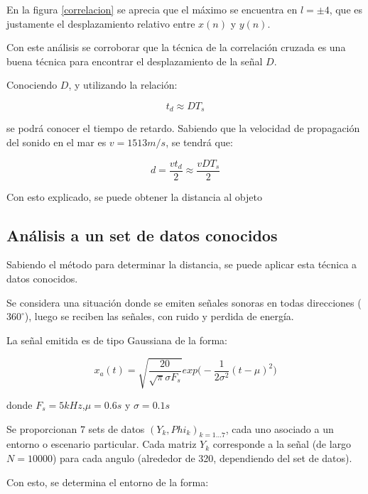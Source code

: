 \documentclass[letterpaper,11pt]{article}
\begin{document}
En la figura \ref{correlacion} se aprecia que el máximo se encuentra en $l = \pm 4$, que es justamente el desplazamiento relativo entre $x(n)$ y $y(n)$.

Con este análisis se corroborar que la técnica de la correlación cruzada es una buena técnica para encontrar el desplazamiento de la señal $D$.\par

Conociendo $D$, y utilizando la relación:

\begin{equation}
t_{d}\approx DT_{s}
\end{equation}

se podrá conocer el tiempo de retardo. Sabiendo que la velocidad de propagación del sonido en el mar es $ v = 1513 m/s$, se tendrá que:

\begin{equation}
d = \frac{vt_{d}}{2} \approx \frac{vDT_{s}}{2}
\end{equation}

Con esto explicado, se puede obtener la distancia al objeto

\subsection{Análisis a un set de datos conocidos}

Sabiendo el método para determinar la distancia, se puede aplicar esta técnica a datos conocidos. \par

Se considera una situación donde se emiten señales sonoras en todas direcciones ($360^{\circ}$), luego se reciben las señales, con ruido y perdida de energía.

La señal emitida es de tipo Gaussiana de la forma:

\begin{equation}
x_{a}(t) = \sqrt{\frac{20}{\sqrt{\pi}\sigma F_{s}}} exp\Bigg( -\frac{1}{2\sigma^2}(t-\mu)^2 \Bigg)
\end{equation}

donde $F_{s} = 5 kHz$,$\mu = 0.6s$ y $\sigma = 0.1s$

Se proporcionan 7 sets de datos $(Y_{k},Phi_{k})_{k=1...7}$, cada uno asociado a un entorno o escenario particular. Cada matriz $Y_{k}$ corresponde a la señal (de largo $N =10000$) para cada angulo (alrededor de 320, dependiendo del set de datos).\par

Con esto, se determina el entorno de la forma:
\end{document}
